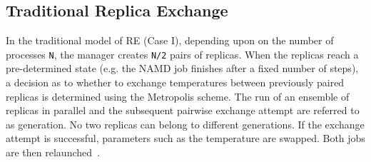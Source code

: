 \documentclass{rspublic}
\begin{document}
\subsection{Traditional Replica Exchange}
In the traditional model of RE (Case I), depending upon
on the number of processes \texttt{N}, the manager creates \texttt{N/2} pairs
of replicas. When the replicas reach a
pre-determined state (e.g. the NAMD job finishes after a fixed number
of steps), a decision as to whether to exchange temperatures between
previously paired replicas is determined using the Metropolis scheme.
The run of an ensemble of replicas in parallel and the subsequent
pairwise exchange attempt are referred to as generation. No two
replicas can belong to different generations. If the exchange attempt
is successful, parameters such as the temperature are swapped. Both
jobs are then relaunched~\citep{Luckow:2008fp}.
\end{document}
